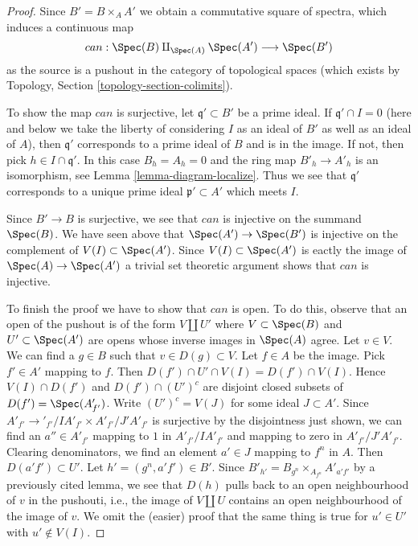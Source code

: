 \begin{proof}
Since $B' = B \times_A A'$ we obtain a commutative square of
spectra, which induces a continuous map
$$
can : \Spec(B) \amalg_{\Spec(A)} \Spec(A') \longrightarrow \Spec(B')
$$
as the source is a pushout in the category
of topological spaces (which exists by
Topology, Section \ref{topology-section-colimits}).

\medskip\noindent
To show the map $can$ is surjective, let $\mathfrak q' \subset B'$ be a prime
ideal. If $\mathfrak q' \cap I = 0$ (here and below we take the liberty
of considering $I$ as an ideal of $B'$ as well as an ideal of $A$),
then $\mathfrak q'$ corresponds to a prime ideal of $B$ and is in the image.
If not, then pick $h \in I \cap \mathfrak q'$. In this case $B_h = A_h = 0$
and the ring map $B'_h \to A'_h$ is an isomorphism, see
Lemma \ref{lemma-diagram-localize}. Thus we see that
$\mathfrak q'$ corresponds to a unique prime ideal $\mathfrak p' \subset A'$
which meets $I$.

\medskip\noindent
Since $B' \to B$ is surjective, we see that $can$ is injective on
the summand $\Spec(B)$. We have seen above that $\Spec(A') \to \Spec(B')$
is injective on the complement of $V(I) \subset \Spec(A')$. Since
$V(I) \subset \Spec(A')$ is eactly the image of $\Spec(A) \to \Spec(A')$
a trivial set theoretic argument shows that $can$ is injective.

\medskip\noindent
To finish the proof we have to show that $can$ is open. To do this, observe
that an open of the pushout is of the form $V \amalg U'$ where
$V \subset \Spec(B)$ and $U' \subset \Spec(A')$ are opens whose inverse
images in $\Spec(A)$ agree. Let $v \in V$. We can find a $g \in B$
such that $v \in D(g) \subset V$. Let $f \in A$ be the image.
Pick $f' \in A'$ mapping to $f$. Then
$D(f') \cap U' \cap V(I) = D(f') \cap V(I)$.
Hence $V(I) \cap D(f')$ and $D(f') \cap (U')^c$ are disjoint closed
subsets of $D(f') = \Spec(A'_{f'})$. Write $(U')^c = V(J)$
for some ideal $J \subset A'$. Since
$A'_{f'} \to'_{f'}/IA'_{f'} \times A'_{f'}/J'A'_{f'}$
is surjective by the disjointness just shown, we can find an $a'' \in A'_{f'}$
mapping to $1$ in $A'_{f'}/IA'_{f'}$ and mapping to zero in
$A'_{f'}/J'A'_{f'}$. Clearing denominators, we find an element
$a' \in J$ mapping to $f^n$ in $A$. Then $D(a'f') \subset U'$.
Let $h' = (g^n, a'f') \in B'$.
Since $B'_{h'} = B_{g^n} \times_{A_{f^n}} A'_{a'f'}$ by a previously
cited lemma, we see that $D(h)$ pulls back to an open neighbourhood
of $v$ in the pushouti, i.e., the image of $V \amalg U$ contains
an open neighbourhood of the image of $v$. We omit the (easier) proof that
the same thing is true for $u' \in U'$ with $u' \not \in V(I)$.
\end{proof}

